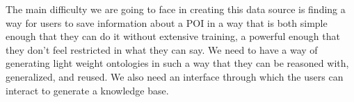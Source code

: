The main difficulty we are going to face in creating this data source is finding a way for users to save information about a POI in a way that is both simple enough that they can do it without extensive training, a powerful enough that they don't feel restricted in what they can say.
We need to have a way of generating light weight ontologies in such a way that they can be reasoned with, generalized, and reused. We also need an interface through which the users can interact to generate a knowledge base.
